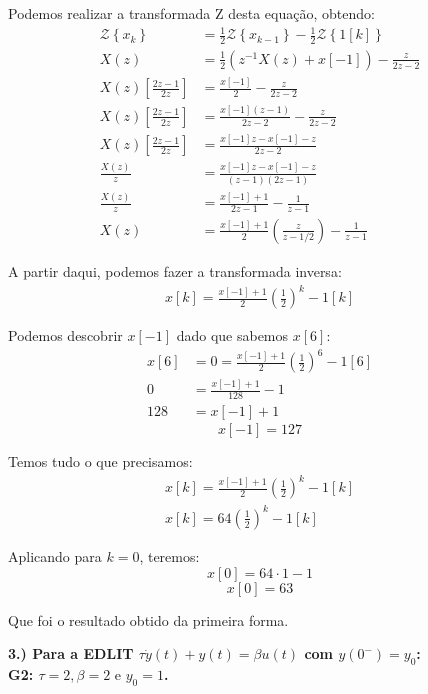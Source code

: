 \documentclass[10pt]{article}
\newcommand{\Z}[1]{\mathcal{Z}\left\{#1\right\}}
\begin{document}
Podemos realizar a transformada Z desta equação, obtendo:
\begin{align*}
    \Z{x_k} &= \frac{1}{2} \Z{x_{k - 1}} - \frac{1}{2} \Z{1[k]}\\
    X(z) &= \frac{1}{2} \left(z^{-1} X(z) + x[-1]\right) - \frac{z}{2z - 2}\\
    X(z) \left[\frac{2z - 1}{2z}\right] &= \frac{x[-1]}{2} - \frac{z}{2z - 2}\\
    X(z) \left[\frac{2z - 1}{2z}\right] &= \frac{x[-1](z - 1)}{2z - 2} - \frac{z}{2z - 2}\\
    X(z) \left[\frac{2z - 1}{2z}\right] &= \frac{x[-1]z - x[-1] - z}{2z - 2}\\
    \frac{X(z)}{z} &= \frac{x[-1]z - x[-1] - z}{(z - 1)(2z - 1)}\\
    \frac{X(z)}{z} &= \frac{x[-1] + 1}{2z - 1} - \frac{1}{z - 1}\\
    X(z) &= \frac{x[-1] + 1}{2} \left(\frac{z}{z - 1/2}\right) - \frac{1}{z - 1}
\end{align*}

A partir daqui, podemos fazer a transformada inversa:
\begin{align*}
    x[k] = \frac{x[-1] + 1}{2} \left(\frac{1}{2}\right)^{k} - 1[k]
\end{align*}

Podemos descobrir $x[-1]$ dado que sabemos $x[6]$:
\begin{align*}
    x[6] &= 0 = \frac{x[-1] + 1}{2} \left(\frac{1}{2}\right)^{6} - 1[6]\\
    0 &= \frac{x[-1] + 1}{128} - 1\\
    128 &= x[-1] + 1
\end{align*}
\[\boxed{x[-1] = 127}\]

Temos tudo o que precisamos:
\begin{align*}
    x[k] = \frac{x[-1] + 1}{2} \left(\frac{1}{2}\right)^{k} - 1[k]\\
    x[k] = 64 \left(\frac{1}{2}\right)^k - 1[k]
\end{align*}

Aplicando para $k = 0$, teremos:
\[x[0] = 64 \cdot 1 - 1\]
\[\boxed{x[0] = 63}\]

Que foi o resultado obtido da primeira forma.

\vspace{\baselineskip}

\textbf{3.) Para a EDLIT $\tau \dot{y}(t) + y(t) = \beta u(t)$ com $y(0^-) = y_0$:\\
\textbf{G2: } $\tau = 2, \beta = 2 \text{ e } y_0 = 1$.}
\end{document}

